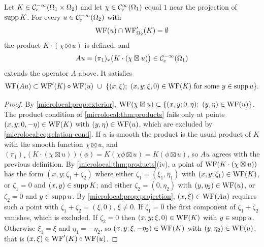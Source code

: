 \begin{theorem}\label{microlocal:thm:relation}
  Let $K\in\mathcal{C}^{-\infty}_{\mathrm{c}}(\Omega_1\times\Omega_2)$ and let $\chi\in\mathcal{C}^\infty_{\mathrm{c}}(\Omega_1)$
  equal $1$ near the projection of $\operatorname{supp} K$. For every $u\in\mathcal{C}^{-\infty}_{\mathrm{c}}(\Omega_2)$
  with
  \begin{equation}\label{microlocal:eq:relation-cond}
    \operatorname{WF}(u)\cap\operatorname{WF}'_{\Omega_2}(K)=\emptyset
  \end{equation}
  the product $K\cdot(\chi\boxtimes u)$ is defined, and
  \begin{equation*}
    Au=(\pi_1)_*\bigl(K\cdot(\chi\boxtimes u)\bigr)\in\mathcal{C}^{-\infty}_{\mathrm{c}}(\Omega_1)
  \end{equation*}
  extends the operator $A$ above. It satisfies
  \begin{equation*}
    \WF(Au)\subset\WFp(K)\circ\WF(u)\ \cup\ \{(x,\xi);\ (x,y;\xi,0)\in\WF(K)
    \text{ for some }y\in\supp u\}.
  \end{equation*}
\end{theorem}
\begin{proof}
  By \cref{microlocal:prop:exterior},
  $\WF(\chi\boxtimes u)\subset\{(x,y;0,\eta);\ (y,\eta)\in\WF(u)\}$. The
  product condition of \cref{microlocal:thm:products} fails only at points
  $(x,y;0,-\eta)\in\operatorname{WF}(K)$ with $(y,\eta)\in\operatorname{WF}(u)$, which are excluded by
  \eqref{microlocal:eq:relation-cond}. If $u$ is smooth the product is
  the usual product of $K$ with the smooth function $\chi\boxtimes u$, and
  $(\pi_1)_*(K\cdot(\chi\boxtimes u))(\phi)=K(\chi\phi\boxtimes u)=K(\phi\boxtimes
  u)$, so $Au$ agrees with the previous definition. By
  \cref{microlocal:thm:products}(iv), a point of
  $\operatorname{WF}(K\cdot(\chi\boxtimes u))$ has the form $(x,y;\zeta_1+\zeta_2)$ where
  either $\zeta_1=(\xi_1,\eta_1)$ with $(x,y;\zeta_1)\in\operatorname{WF}(K)$, or
  $\zeta_1=0$ and $(x,y)\in\operatorname{supp} K$; and either $\zeta_2=(0,\eta_2)$ with
  $(y,\eta_2)\in\operatorname{WF}(u)$, or $\zeta_2=0$ and $y\in\operatorname{supp} u$. By
  \cref{microlocal:prop:projection}, $(x,\xi)\in\operatorname{WF}(Au)$ requires such a
  point with $\zeta_1+\zeta_2=(\xi,0)$, $\xi\ne0$. If $\zeta_1=0$ the first
  component of $\zeta_1+\zeta_2$ vanishes, which is excluded. If $\zeta_2=0$
  then $(x,y;\xi,0)\in\operatorname{WF}(K)$ with $y\in\operatorname{supp} u$. Otherwise $\xi_1=\xi$ and
  $\eta_1=-\eta_2$, so $(x,y;\xi,-\eta_2)\in\operatorname{WF}(K)$ with
  $(y,\eta_2)\in\operatorname{WF}(u)$, that is $(x,\xi)\in\operatorname{WF}'(K)\circ\operatorname{WF}(u)$.
\end{proof}

